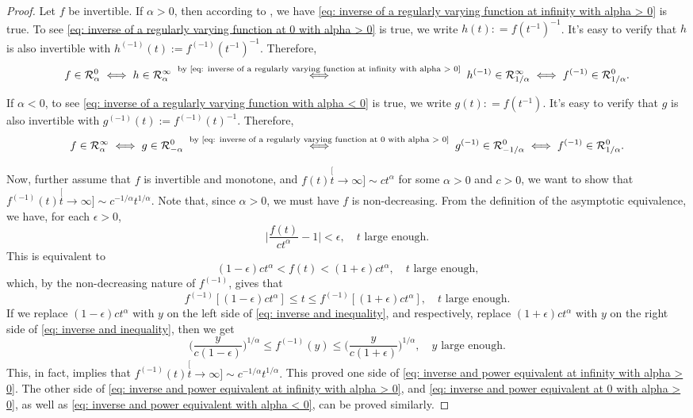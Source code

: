 \documentclass[12pt, a4paper]{amsart}
\theoremstyle{definition}
\numberwithin{equation}{section}
\begin{document}
\begin{proof}
	Let $f$ be invertible.
	If $\alpha>0$, then according to \cite[Theorem 1.5.12.]{BinghamGoldieTeugels1989Regular}, we have \eqref{eq: inverse of a regularly varying function at infinity with alpha > 0} is true. 
	To see 	\eqref{eq: inverse of a regularly varying function at 0 with alpha > 0} is true, we write $h(t) : = f(t^{-1})^{-1}$. 
	It's easy to verify that $h$ is also invertible with $h^{(-1)}(t) := f^{(-1)}(t^{-1})^{-1} $. 
	Therefore,
\[ 
	f
	\in \mathcal R^0_{\alpha}
	\iff h 
	\in \mathcal R^\infty_{\alpha}
	\stackrel{  \text{ by \eqref{eq: inverse of a regularly varying function at infinity with alpha > 0} }   }{\iff} h^{(-1)} 
	\in \mathcal R^\infty_{1/\alpha}
	\iff f^{(-1)} 
	\in \mathcal R^0_{1/\alpha}.
\] 

	If $\alpha < 0$, to see	\eqref{eq: inverse of a regularly varying function with alpha < 0} is true, we write $g(t) : = f(t^{-1})$. 
	It's easy to verify that $g$ is also invertible with $g^{(-1)}(t) := f^{(-1)}(t)^{-1}$. 
	Therefore,
\[ 
	f
	\in \mathcal R^\infty_{\alpha}
	\iff g
	\in \mathcal R^0_{-\alpha}
	\stackrel{  \text{ by \eqref{eq: inverse of a regularly varying function at 0 with alpha > 0} }   }{\iff} g^{(-1)} 
	\in \mathcal R^0_{-1/\alpha}
	\iff f^{(-1)} 
	\in \mathcal R^0_{1/\alpha}.
\] 
	
	Now, further assume that $f$ is invertible and monotone, and $f(t) \stackrel[t\to \infty]{}{\sim} c t^\alpha$ for some $\alpha > 0$ and $c > 0$, we want to show that $f^{(-1)}(t) \stackrel[t\to \infty]{}{\sim} c^{-1/\alpha} t^{1/\alpha}$.
	Note that, since $\alpha >0$, we must have $f$ is non-decreasing.
	From the definition of the asymptotic equivalence, we have, for each $\epsilon> 0$, 
\[
	\big|\frac{f(t)}{c t^\alpha} - 1\big|
	< \epsilon,
	\quad t \text{ large enough.}
\]
	This is equivalent to 
\[
	(1-\epsilon) c t^{\alpha} 
	< f(t) 
	< (1+ \epsilon)c t^{\alpha}, 
	\quad t \text{ large enough,}
\]
	which, by the non-decreasing nature of $f^{(-1)}$, gives that
\[\label{eq: inverse and inequality}
	f^{(-1)}[(1-\epsilon) c t^{\alpha}] \leq t \leq f^{(-1)}[(1+ \epsilon)c t^{\alpha}], \quad t \text{ large enough.}
\]
	If we replace $(1-\epsilon) c t^{\alpha}$ with $y$ on the left side of \eqref{eq: inverse and inequality}, and respectively, replace $(1+\epsilon) c t^{\alpha}$ with $y$ on the right side of \eqref{eq: inverse and inequality}, then we get
\[
	\Big(\frac{y}{c(1-\epsilon)}\Big)^{1/\alpha} 
	\leq f^{(-1)}(y) \leq \Big(\frac{y}{c(1+\epsilon)}\Big)^{1/\alpha}, 
	\quad y \text{ large enough.}
\]
	This, in fact, implies that $ f^{(-1)}(t) \stackrel[t\to \infty]{}{\sim} c^{-1/\alpha} t^{1/\alpha}. $ 
	This proved one side of \eqref{eq: inverse and power equivalent at infinity with alpha > 0}. 
	The other side of \eqref{eq: inverse and power equivalent at infinity with alpha > 0}, and \eqref{eq: inverse and power equivalent at 0 with alpha > 0}, as well as \eqref{eq: inverse and power equivalent with alpha < 0}, can be proved similarly.
\end{proof}
\end{document}
